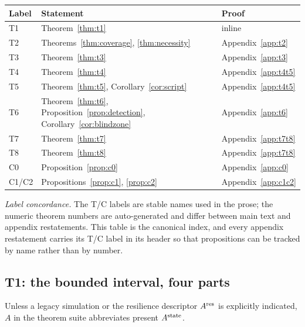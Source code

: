 \begin{center}\small
\begin{tabular}{@{}lll@{}}
\toprule
Label & Statement & Proof \\
\midrule
T1 & Theorem~\ref{thm:t1} & inline \\
T2 & Theorems~\ref{thm:coverage}, \ref{thm:necessity} & Appendix~\ref{app:t2} \\
T3 & Theorem~\ref{thm:t3} & Appendix~\ref{app:t3} \\
T4 & Theorem~\ref{thm:t4} & Appendix~\ref{app:t4t5} \\
T5 & Theorem~\ref{thm:t5}, Corollary~\ref{cor:script} & Appendix~\ref{app:t4t5} \\
T6 & Theorem~\ref{thm:t6}, Proposition~\ref{prop:detection}, Corollary~\ref{cor:blindzone} & Appendix~\ref{app:t6} \\
T7 & Theorem~\ref{thm:t7} & Appendix~\ref{app:t7t8} \\
T8 & Theorem~\ref{thm:t8} & Appendix~\ref{app:t7t8} \\
C0 & Proposition~\ref{prop:c0} & Appendix~\ref{app:c0} \\
C1/C2 & Propositions~\ref{prop:c1}, \ref{prop:c2} & Appendix~\ref{app:c1c2} \\
\bottomrule
\end{tabular}
\end{center}

\noindent\emph{Label concordance.} The T/C labels are stable names used in
the prose; the numeric theorem numbers are auto-generated and differ between
main text and appendix restatements. This table is the canonical index, and
every appendix restatement carries its T/C label in its header so that
propositions can be tracked by name rather than by number.

\subsection{T1: the bounded interval, four parts}\label{sec:t1}

Unless a legacy simulation or the resilience descriptor $A^{\mathrm{res}}$ is explicitly
indicated, $A$ in the theorem suite abbreviates present $A^{\mathrm{state}}$.

